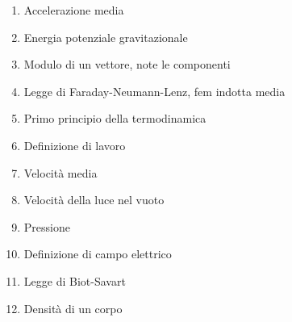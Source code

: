 \documentclass[a4paper,11pt,italian]{article}
\begin{document}
\begin{enumerate}
\item Accelerazione media
\item Energia potenziale gravitazionale
\item Modulo di un vettore, note le componenti
\item Legge di Faraday-Neumann-Lenz, fem indotta media
\item Primo principio della termodinamica
\item Definizione di lavoro
\item Velocità media
\item Velocità della luce nel vuoto
\item Pressione 
\item Definizione di campo elettrico
\item Legge di Biot-Savart
\item Densità di un corpo
\end{enumerate}
\end{document}
